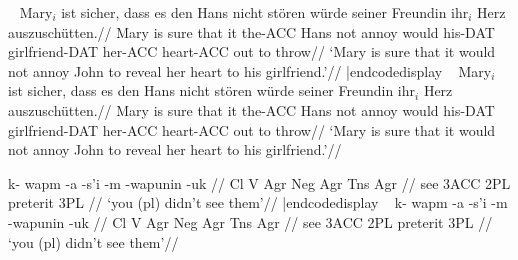\vfil\eject
{}
\medskip

\codedisplay~
\ex
\begingl[glstyle=wrap]
\gla Mary$_i$ ist sicher, dass es den Hans nicht st\"oren
w\"urde seiner Freundin ihr$_i$ Herz auszusch\"utten.//
\glb Mary is sure that it the-ACC Hans not annoy would
his-DAT girlfriend-DAT her-ACC heart-ACC {out to throw}//
\glft  `Mary is sure that it would not annoy John to reveal her
heart to his girlfriend.'//
\endgl
\xe|endcodedisplay
\framedisplay~
\ex
\begingl
\gla Mary$_i$ ist sicher, dass es den Hans nicht st\"oren
w\"urde seiner Freundin ihr$_i$ Herz auszusch\"utten.//
\glb Mary is sure that it the-ACC Hans not annoy would
his-DAT girlfriend-DAT her-ACC heart-ACC {out to throw}//
\glft  `Mary is sure that it would not annoy John to reveal her
heart to his girlfriend.'//
\endgl
\xe\endframedisplay

%
\codedisplay
\ex
\begingl
\gla k- wapm -a -s'i -m -wapunin -uk //
\glb Cl V Agr Neg Agr Tns Agr //
 see {3\sc ACC} {} 2{\sc PL} preterit 3{\sc PL} //
\glft `you (pl) didn't see them'//
\endgl
\xe|endcodedisplay
\framedisplay~
\ex
\begingl
\gla k- wapm -a -s'i -m -wapunin -uk //
\glb Cl V Agr Neg Agr Tns Agr //
 see {3\sc ACC} {} 2{\sc PL} preterit 3{\sc PL} //
\glft `you (pl) didn't see them'//
\endgl
\xe
\endframedisplay

